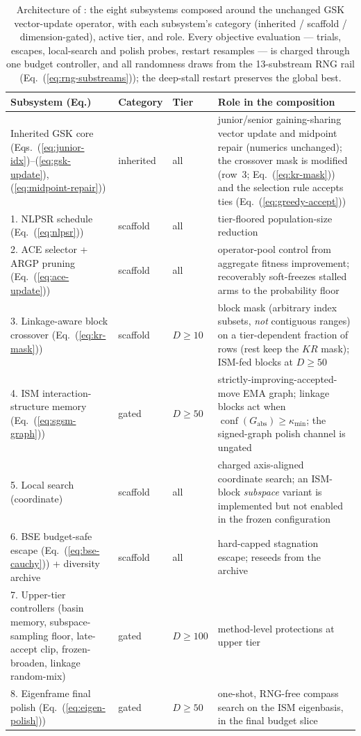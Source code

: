 \begin{table}[t]
\caption{Architecture of \dtgsk{}: the eight subsystems composed
around the unchanged GSK vector-update operator, with each subsystem's category
(inherited / scaffold / dimension-gated), active tier, and role. Every
objective evaluation --- trials, escapes, local-search and polish probes,
restart resamples --- is charged through one budget controller, and all
randomness draws from the 13-substream RNG rail
(Eq.~(\ref{eq:rng-substreams})); the deep-stall restart preserves the global
best.}
\label{tab:architecture}
\centering
\footnotesize
\zebra
\begin{tabular}{p{3.3cm}ll p{6.5cm}}
\toprule
\textbf{Subsystem (Eq.)} & \textbf{Category} & \textbf{Tier} & \textbf{Role in the composition} \\
\midrule
Inherited GSK core (Eqs.~(\ref{eq:junior-idx})--(\ref{eq:gsk-update}), (\ref{eq:midpoint-repair})) & inherited & all & junior/senior gaining-sharing vector update and midpoint repair (numerics unchanged); the crossover mask is modified (row~3; Eq.~(\ref{eq:kr-mask})) and the selection rule accepts ties (Eq.~(\ref{eq:greedy-accept})) \\
1. NLPSR schedule (Eq.~(\ref{eq:nlpsr})) & scaffold & all & tier-floored population-size reduction \\
2. ACE selector + ARGP pruning (Eq.~(\ref{eq:ace-update})) & scaffold & all & operator-pool control from aggregate fitness improvement; recoverably soft-freezes stalled arms to the probability floor \\
3. Linkage-aware block crossover (Eq.~(\ref{eq:kr-mask})) & scaffold & $D{\ge}10$ & block mask (arbitrary index subsets, \emph{not} contiguous ranges) on a tier-dependent fraction of rows (rest keep the $KR$ mask); ISM-fed blocks at $D{\ge}50$ \\
4. ISM interaction-structure memory (Eq.~(\ref{eq:sgsm-graph})) & gated & $D{\ge}50$ & strictly-improving-accepted-move EMA graph; linkage blocks act when $\operatorname{conf}(G_{\mathrm{abs}})\ge\kappa_{\min}$; the signed-graph polish channel is ungated \\
5. Local search (coordinate) & scaffold & all & charged axis-aligned coordinate search; an ISM-block \emph{subspace} variant is implemented but not enabled in the frozen configuration \\
6. BSE budget-safe escape (Eq.~(\ref{eq:bse-cauchy})) + diversity archive & scaffold & all & hard-capped stagnation escape; reseeds from the archive \\
7. Upper-tier controllers (basin memory, subspace-sampling floor, late-accept clip, frozen-broaden, linkage random-mix) & gated & $D{\ge}100$ & method-level protections at upper tier \\
8. Eigenframe final polish (Eq.~(\ref{eq:eigen-polish})) & gated & $D{\ge}50$ & one-shot, RNG-free compass search on the ISM eigenbasis, in the final budget slice \\
\bottomrule
\end{tabular}
\end{table}

